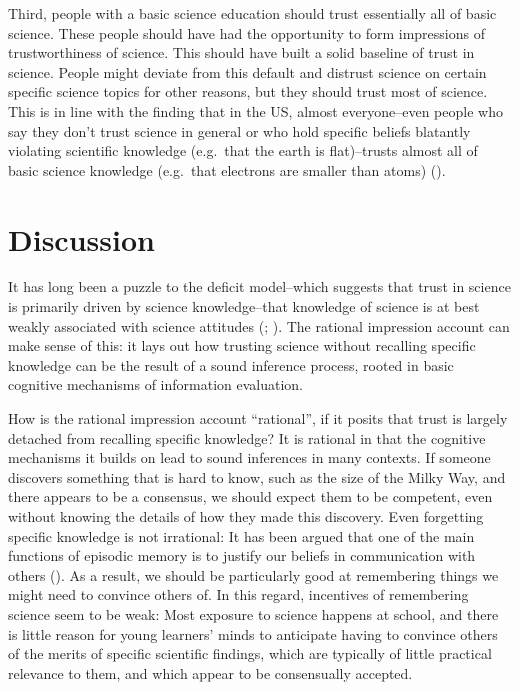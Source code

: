 \documentclass[
  jou,
  floatsintext,
  longtable,
  nolmodern,
  notxfonts,
  notimes,
  colorlinks=true,linkcolor=blue,citecolor=blue,urlcolor=blue]{apa7}
\begin{document}
Third, people with a basic science education should trust essentially
all of basic science. These people should have had the opportunity to
form impressions of trustworthiness of science. This should have built a
solid baseline of trust in science. People might deviate from this
default and distrust science on certain specific science topics for
other reasons, but they should trust most of science. This is in line
with the finding that in the US, almost everyone--even people who say
they don't trust science in general or who hold specific beliefs
blatantly violating scientific knowledge (e.g.~that the earth is
flat)--trusts almost all of basic science knowledge (e.g.~that electrons
are smaller than atoms)
().

\section{Discussion}\label{discussion}

It has long been a puzzle to the deficit model--which suggests that
trust in science is primarily driven by science knowledge--that
knowledge of science is at best weakly associated with science attitudes
(;
). The rational
impression account can make sense of this: it lays out how trusting
science without recalling specific knowledge can be the result of a
sound inference process, rooted in basic cognitive mechanisms of
information evaluation.

How is the rational impression account ``rational'', if it posits that
trust is largely detached from recalling specific knowledge? It is
rational in that the cognitive mechanisms it builds on lead to sound
inferences in many contexts. If someone discovers something that is hard
to know, such as the size of the Milky Way, and there appears to be a
consensus, we should expect them to be competent, even without knowing
the details of how they made this discovery. Even forgetting specific
knowledge is not irrational: It has been argued that one of the main
functions of episodic memory is to justify our beliefs in communication
with others
().
As a result, we should be particularly good at remembering things we
might need to convince others of. In this regard, incentives of
remembering science seem to be weak: Most exposure to science happens at
school, and there is little reason for young learners' minds to
anticipate having to convince others of the merits of specific
scientific findings, which are typically of little practical relevance
to them, and which appear to be consensually accepted.
\end{document}
